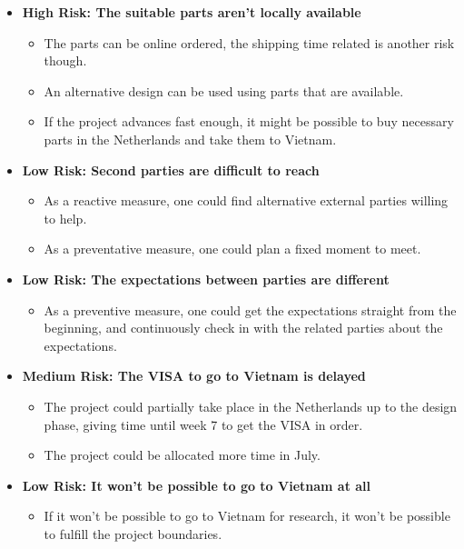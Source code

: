 \documentclass[11pt, a4paper]{article}
\begin{document}
\begin{itemize}
    \item \textbf{High Risk: The suitable parts aren't locally available}
          \begin{itemize} 
            \item The parts can be online ordered, the shipping time related is another risk though.
            \item An alternative design can be used using parts that are available.
            \item If the project advances fast enough, it might be possible to buy necessary parts in the Netherlands and take them to Vietnam.
          \end{itemize}
    \item \textbf{Low Risk: Second parties are difficult to reach}
          \begin{itemize} 
            \item As a reactive measure, one could find alternative external parties willing to help.
            \item As a preventative measure, one could plan a fixed moment to meet.
          \end{itemize}
    \item \textbf{Low Risk: The expectations between parties are different}
          \begin{itemize} 
            \item As a preventive measure, one could get the expectations straight from the beginning, and continuously check in with the related parties about the expectations. 
          \end{itemize}
    \item \textbf{Medium Risk: The VISA to go to Vietnam is delayed}
          \begin{itemize} 
            \item The project could partially take place in the Netherlands up to the design phase, giving time until week 7 to get the VISA in order.
            \item The project could be allocated more time in July.
          \end{itemize}
    \item \textbf{Low Risk: It won't be possible to go to Vietnam at all}
          \begin{itemize} 
            \item If it won't be possible to go to Vietnam for research, it won't be possible to fulfill the project boundaries.

\end{itemize}
\end{itemize}
\end{document}

